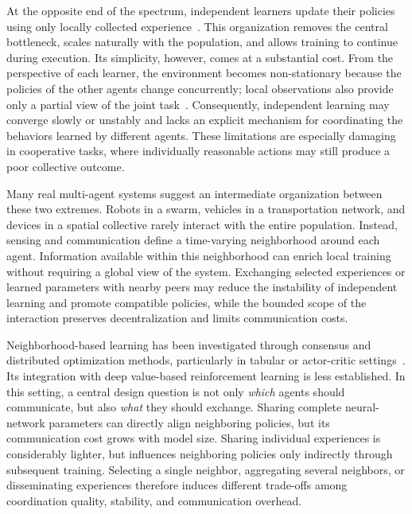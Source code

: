 At the opposite end of the spectrum, 
 independent learners update their policies using only locally collected experience~\cite{abed2016comparison}.
%
This organization removes the central bottleneck, 
 scales naturally with the population, 
 and allows training to continue during execution.
%
Its simplicity, however, comes at a substantial cost.
%
From the perspective of each learner, 
 the environment becomes non-stationary because the policies of the other agents change concurrently; 
 local observations also provide only a partial view of the joint task~\cite{DBLP:journals/tcyb/NguyenNN20}.
%
Consequently, 
 independent learning may converge slowly or unstably 
 and lacks an explicit mechanism for coordinating the behaviors learned by different agents.
%
These limitations are especially damaging in cooperative tasks, 
 where individually reasonable actions may still produce a poor collective outcome.

Many real multi-agent systems suggest an intermediate organization between these two extremes.
%
Robots in a swarm, vehicles in a transportation network, 
 and devices in a spatial collective rarely interact with the entire population.
%
Instead, 
 sensing and communication define a time-varying neighborhood around each agent.
% 
Information available within this neighborhood can enrich local training 
 without requiring a global view of the system.
%
Exchanging selected experiences or learned parameters with nearby peers 
 may reduce the instability of independent learning and promote compatible policies, 
 while the bounded scope of the interaction preserves decentralization 
 and limits communication costs.

Neighborhood-based learning has been investigated through consensus 
 and distributed optimization methods, 
 particularly in tabular or actor-critic settings~\cite{kar2012qd,DBLP:conf/icml/ZhangYBH18,DBLP:journals/jmlr/CiosekW20}.
%
Its integration with deep value-based reinforcement learning is less established.
%
In this setting, 
 a central design question is not only \emph{which} agents should communicate, 
 but also \emph{what} they should exchange.
%
Sharing complete neural-network parameters can directly align neighboring policies, 
 but its communication cost grows with model size.
%
Sharing individual experiences is considerably lighter, 
 but influences neighboring policies only indirectly through subsequent training.
%
Selecting a single neighbor, aggregating several neighbors, or disseminating experiences 
 therefore induces different trade-offs among coordination quality,
 stability, and communication overhead.

